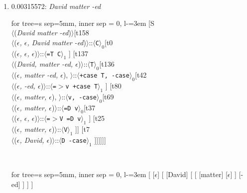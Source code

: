 \documentclass[11pt]{article}
\begin{document}
\begin{enumerate}
	\item  0.00315572: \textit{David matter -ed} \\[0.5em]
	\begin{adjustbox}{max width = \textwidth}
	\begin{forest}
	for tree={s sep=5mm, inner sep = 0, l-=3em}
	[S\\$\langle$(\textit{David matter -ed})$\rangle$[t158\\$\langle$(\textit{$\epsilon${,} $\epsilon${,} David matter -ed})$\rangle$::$\langle$\texttt{C}$\rangle_0$[t0\\$\langle$(\textit{$\epsilon${,} $\epsilon${,} $\epsilon$})$\rangle$::$\langle$\texttt{{=}T C}$\rangle_1$ ] [t137\\$\langle$(\textit{David{,} matter -ed{,} $\epsilon$})$\rangle$::$\langle$\texttt{T}$\rangle_0$[t136\\$\langle$(\textit{$\epsilon${,} matter -ed{,} $\epsilon$}){,} $\rangle$::$\langle$\texttt{+case T{,} -case}$\rangle_0$[t42\\$\langle$(\textit{$\epsilon${,} -ed{,} $\epsilon$})$\rangle$::$\langle$\texttt{{=}$>$v +case T}$\rangle_1$ ] [t80\\$\langle$(\textit{$\epsilon${,} matter{,} $\epsilon$}){,} $\rangle$::$\langle$\texttt{v{,} -case}$\rangle_0$[t69\\$\langle$(\textit{$\epsilon${,} matter{,} $\epsilon$})$\rangle$::$\langle$\texttt{{=}D v}$\rangle_0$[t37\\$\langle$(\textit{$\epsilon${,} $\epsilon${,} $\epsilon$})$\rangle$::$\langle$\texttt{{=}$>$V {=}D v}$\rangle_1$ ] [t25\\$\langle$(\textit{$\epsilon${,} matter{,} $\epsilon$})$\rangle$::$\langle$\texttt{V}$\rangle_1$ ]] [t7\\$\langle$(\textit{$\epsilon${,} David{,} $\epsilon$})$\rangle$::$\langle$\texttt{D -case}$\rangle_1$ ]]]]]]
	\end{forest}
	\end{adjustbox}
	\\
	\begin{adjustbox}{max width = \textwidth}
	\begin{forest}
	for tree={s sep=5mm, inner sep = 0, l-=3em}
	[ [$\epsilon$] [ [David] [ [ [matter] [$\epsilon$] ] [-ed] ] ] ]
	\end{forest}
	\end{adjustbox}
	\newpage


\end{enumerate}
\end{document}
